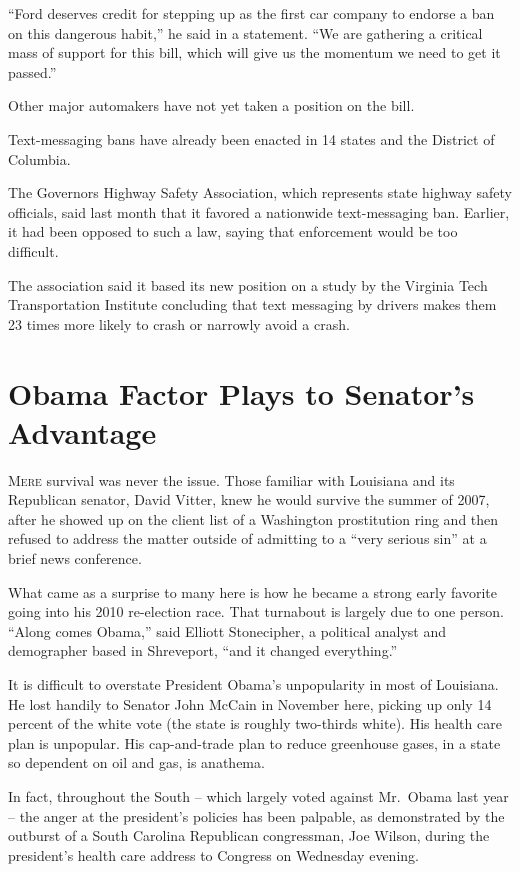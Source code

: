 ﻿\documentclass[12pt]{article}
\begin{document}
``Ford deserves credit for stepping up as the first car company to endorse a ban on this dangerous
habit,'' he said in a statement. ``We are gathering a critical mass of support for this bill, which
will give us the momentum we need to get it passed.''

Other major automakers have not yet taken a position on the bill.

Text-messaging bans have already been enacted in 14 states and the District of Columbia.

The Governors Highway Safety Association, which represents state highway safety officials, said last
month that it favored a nationwide text-messaging ban. Earlier, it had been opposed to such a law,
saying that enforcement would be too difficult.

The association said it based its new position on a study by the Virginia Tech Transportation
Institute concluding that text messaging by drivers makes them 23 times more likely to crash or
narrowly avoid a crash.

\section{Obama Factor Plays to Senator's Advantage}

\lettrine{M}{ere} survival was never the issue. Those familiar with Louisiana and its Republican
senator, David Vitter, knew he would survive the summer of 2007, after he showed up on the client
list of a Washington prostitution ring and then refused to address the matter outside of admitting
to a ``very serious sin'' at a brief news conference.

What came as a surprise to many here is how he became a strong early favorite going into his 2010
re-election race. That turnabout is largely due to one person. ``Along comes Obama,'' said Elliott
Stonecipher, a political analyst and demographer based in Shreveport, ``and it changed everything.''

It is difficult to overstate President Obama's unpopularity in most of Louisiana. He lost handily to
Senator John McCain in November here, picking up only 14 percent of the white vote (the state is
roughly two-thirds white). His health care plan is unpopular. His cap-and-trade plan to reduce
greenhouse gases, in a state so dependent on oil and gas, is anathema.

In fact, throughout the South -- which largely voted against Mr.~Obama last year -- the anger at the
president's policies has been palpable, as demonstrated by the outburst of a South Carolina
Republican congressman, Joe Wilson, during the president's health care address to Congress on
Wednesday evening.
\end{document}
